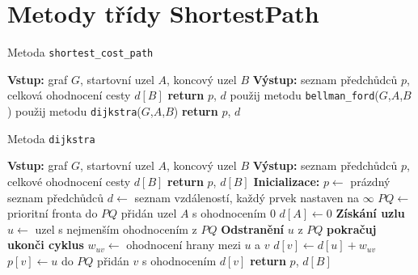 \section{Metody třídy ShortestPath} \label{AppenA}


\begin{algorithm}
    \caption{Metoda \texttt{shortest\_cost\_path}}
    \begin{algorithmic}[1]
        \STATE \textbf{Vstup:} graf $G$, startovní uzel $A$, koncový uzel $B$
        \STATE \textbf{Výstup:} seznam předchůdců $p$, celková ohodnocení cesty $d[B]$
            \STATE \textbf{return} $p$, $d$
        \ENDIF
            \STATE použij metodu \texttt{bellman\_ford}($G$,$A$,$B$)
        \ELSE
            \STATE použij metodu \texttt{dijkstra}($G$,$A$,$B$)
        \ENDIF
        \STATE \textbf{return} $p$, $d$
    \end{algorithmic}
\end{algorithm}

\begin{algorithm}
    \caption{Metoda \texttt{dijkstra}}
    \begin{algorithmic}[1]
        \STATE \textbf{Vstup:} graf $G$, startovní uzel $A$, koncový uzel $B$
        \STATE \textbf{Výstup:} seznam předchůdců $p$, celkové ohodnocení cesty $d[B]$
            \STATE \textbf{return} $p$, $d[B]$
        \ENDIF
        \STATE \textbf{Inicializace:}
        \STATE \quad $p \gets$ prázdný seznam předchůdců
        \STATE \quad $d \gets$ seznam vzdáleností, každý prvek nastaven na $\infty$
        \STATE \quad $PQ \gets$ prioritní fronta
        \STATE do $PQ$ přidán uzel $A$ s ohodnocením $0$
        \STATE $d[A] \gets 0$
            \STATE \textbf{Získání uzlu} $u \gets$ uzel s nejmenším ohodnocením z $PQ$
            \STATE \textbf{Odstranění} $u$ z $PQ$
                \STATE \textbf{pokračuj}
            \ENDIF
                \STATE \textbf{ukonči cyklus}
            \ENDIF
                \STATE $w_{uv} \gets$ ohodnocení hrany mezi $u$ a $v$
                    \STATE $d[v] \gets d[u] + w_{uv}$
                    \STATE $p[v] \gets u$
                    \STATE do $PQ$ přidán $v$ s ohodnocením $d[v]$
                \ENDIF
            \ENDFOR
        \ENDWHILE
        \STATE \textbf{return} $p$, $d[B]$
    \end{algorithmic}
\end{algorithm}

